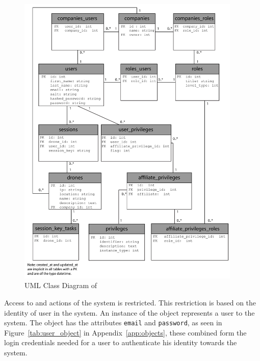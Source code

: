 \begin{figure}[htb]
    \centering
    \includegraphics[width=0.95\textwidth]{gfx/UML_model.pdf}
    \caption{UML Class Diagram of \projectname{}}
    \label{fig:UML_class_diagram}
\end{figure}


Access to and actions of the system is restricted.
This restriction is based on the identity of user in the system.
An instance of the  object represents a user to the system.
The  object has the attributes \verb+email+ and \verb+password+, as seen in Figure~\ref{tab:user_object} in Appendix~\ref{app:objects}, these combined form the login credentials needed for a user to authenticate his identity towards the system. \\

